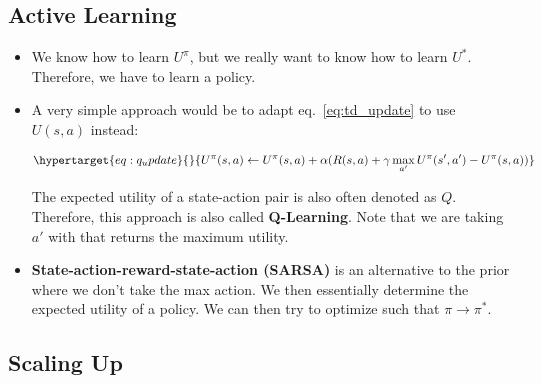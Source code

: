 \documentclass[
]{book}
\begin{document}
\hypertarget{active-learning}{%
\subsection{Active Learning}\label{active-learning}}

\begin{itemize}
\item
  We know how to learn \(U^\pi\), but we really want to know how to
  learn \(U^*\). Therefore, we have to learn a policy.
\item
  A very simple approach would be to adapt eq.~\ref{eq:td_update} to use
  \(U(s, a)\) instead:

  \begin{equation}\protect\hypertarget{eq:q_update}{}{
  U^\pi(s, a) \leftarrow U^\pi(s, a) + \alpha(R(s, a) + \gamma \max_{a'} U^\pi(s', a') -
  U^\pi(s, a))
  }\label{eq:q_update}\end{equation}

  The expected utility of a state-action pair is also often denoted as
  \(Q\). Therefore, this approach is also called \textbf{Q-Learning}.
  Note that we are taking \(a'\) with that returns the maximum utility.
\item
  \textbf{State-action-reward-state-action (SARSA)} is an alternative to
  the prior where we don't take the max action. We then essentially
  determine the expected utility of a policy. We can then try to
  optimize such that \(\pi \rightarrow \pi^*\).
\end{itemize}

\hypertarget{scaling-up}{%
\subsection{Scaling Up}\label{scaling-up}}
\end{document}
